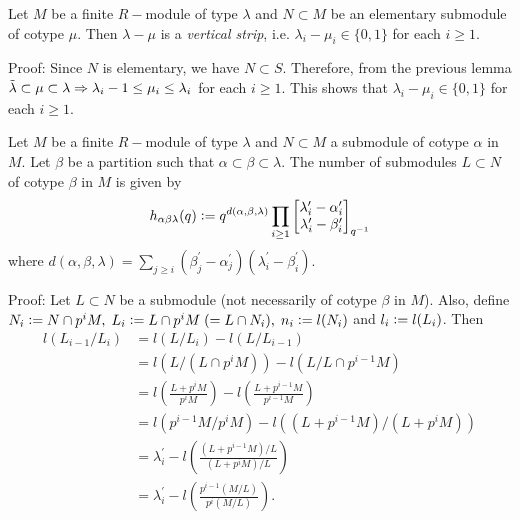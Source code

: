 \begin{dang}
    \begin{lemma}\label{vertical strip lemma}\cite{macdonald1998symmetric}
        Let $M$ be a finite $R-$module of type $\lambda$ and $N\subset M$ be an elementary submodule of cotype $\mu$. Then $\lambda-\mu$ is a \textit{vertical strip}, i.e. $\lambda_i-\mu_i\in\{0,1\}$ for each $i\geq1$. 
    \end{lemma}
\end{dang}
Proof: Since $N$ is elementary, we have $N\subset S$. Therefore, from the previous lemma $\Tilde{\lambda}\subset\mu\subset\lambda\Rightarrow \lambda_i-1\leq\mu_i\leq\lambda_i$ for each $i\geq1$. This shows that $\lambda_i-\mu_i\in\{0,1\}$ for each $i\geq1$.

\begin{dang}
    \begin{theorem}\cite{macdonald1998symmetric}
        Let $M$ be a finite $R-$module of type $\lambda$ and $N\subset M$ a submodule of cotype $\alpha$ in $M$. Let $\beta$ be a partition such that $\alpha\subset \beta\subset\lambda$. The number of submodules $L\subset N$ of cotype $\beta$ in $M$ is given by
        \begin{equation}
            h_{\alpha\beta\lambda}(q) \bydef q^{d(\alpha,\beta,\lambda)}\prod_{i\geq1}\gausspol{\lambda_i^\prime-\alpha_i^\prime}{\lambda_i^\prime-\beta_i^\prime}_{q^{-1}}
        \end{equation}
        where $d(\alpha,\beta,\lambda)=\sum_{j\geq i}(\beta_j^\prime-\alpha_j^\prime)(\lambda_i^\prime-\beta_i^\prime)$.
    \end{theorem}
\end{dang}
Proof: Let $L\subset N$ be a submodule (not necessarily of cotype $\beta$ in $M$). Also, define $N_i\bydef N\cap p^iM,\;L_i\bydef L\cap p^iM\;(= L\cap N_i),\; n_i\bydef l(N_i)$ and $l_i\bydef l(L_i)$. Then
\begin{equation}
    \begin{split}
        l(L_{i-1}/L_i)&=l(L/L_i)-l(L/L_{i-1})\\
        &=l(L/(L\cap p^iM))-l(L/L\cap p^{i-1}M)\\
        &=l\left(\frac{L+p^iM}{p^iM}\right)-l\left(\frac{L+p^{i-1}M}{p^{i-1}M}\right)\\
        &=l(p^{i-1}M/p^iM)-l((L+p^{i-1}M)/(L+p^iM))\\
        &=\lambda_i^\prime - l\left(\frac{(L+p^{i-1}M)/L}{(L+p^{i}M)/L}\right)\\
        &=\lambda_i^\prime - l\left(\frac{p^{i-1}(M/L)}{p^i(M/L)}\right).
    \end{split}
\end{equation}
